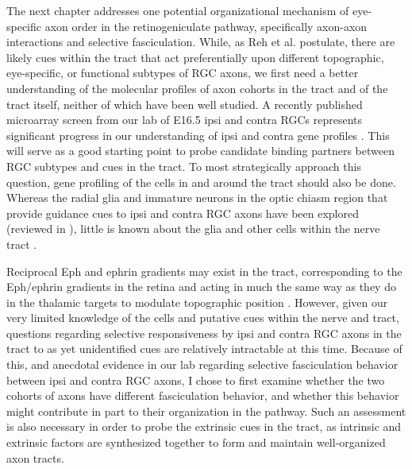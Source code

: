 The next chapter addresses one potential organizational mechanism of eye-specific axon order in the retinogeniculate pathway, specifically axon-axon interactions and selective fasciculation.
While, as Reh et al.  postulate, there are likely cues within the tract that act preferentially upon different topographic, eye-specific, or functional subtypes of RGC axons, we first need a better understanding of the molecular profiles of axon cohorts in the tract and of the tract itself, neither of which have been well studied.
A recently published microarray screen from our lab of E16.5 ipsi and contra RGCs represents significant progress in our understanding of ipsi and contra gene profiles \cite{wang2016ipsilateral}.
This will serve as a good starting point to probe candidate binding partners between RGC subtypes and cues in the tract.
To most strategically approach this question, gene profiling of the cells in and around the tract should also be done.
Whereas the radial glia and immature neurons in the optic chiasm region that provide guidance cues to ipsi and contra RGC axons have been explored (reviewed in ), little is known about the glia and other cells within the nerve tract \cite{colello1992observations,guillery1987changing}.

Reciprocal Eph and ephrin gradients may exist in the tract, corresponding to the Eph/ephrin gradients in the retina and acting in much the same way as they do in the thalamic targets to modulate topographic position \cite{feldheim2010visual,flanagan2006neural,mclaughlin2005molecular}.
However, given our very limited knowledge of the cells and putative cues within the nerve and tract, questions regarding selective responsiveness by ipsi and contra RGC axons in the tract to as yet unidentified cues are relatively intractable at this time.
Because of this, and anecdotal evidence in our lab regarding selective fasciculation behavior between ipsi and contra RGC axons, I chose to first examine whether the two cohorts of axons have different fasciculation behavior, and whether this behavior might contribute in part to their organization in the pathway.
Such an assessment is also necessary in order to probe the extrinsic cues in the tract, as intrinsic and extrinsic factors are synthesized together to form and maintain well-organized axon tracts.
